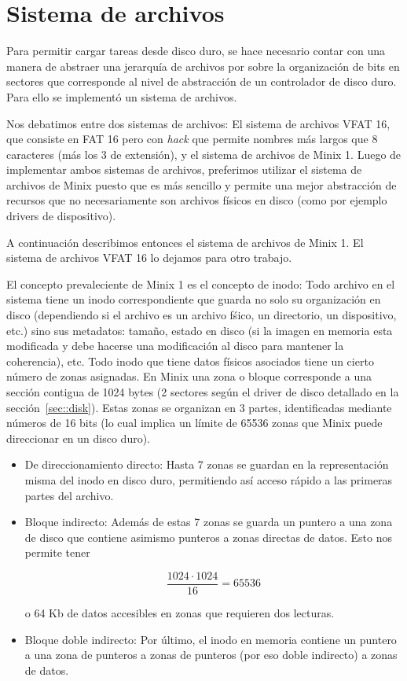 \section{Sistema de archivos}
\label{sec::filesystem}

Para permitir cargar tareas desde disco duro, se hace necesario contar con una manera de
abstraer una jerarqu\'ia de archivos por sobre la organizaci\'on de bits en sectores que
corresponde al nivel de abstracci\'on de un controlador de disco duro. Para ello se
implement\'o un sistema de archivos.

Nos debatimos entre dos sistemas de archivos: El sistema de archivos VFAT 16, que consiste
en FAT 16 pero con \textit{hack} que permite nombres m\'as largos que 8 caracteres (m\'as los
3 de extensi\'on), y el sistema de archivos de Minix 1. Luego de implementar ambos sistemas de
archivos, preferimos utilizar el sistema de archivos de Minix puesto que es m\'as sencillo y
permite una mejor abstracci\'on de recursos que no necesariamente son archivos f\'isicos en disco
(como por ejemplo drivers de dispositivo).

A continuaci\'on describimos entonces el sistema de archivos de Minix 1. El sistema de archivos
VFAT 16 lo dejamos para otro trabajo.

El concepto prevaleciente de Minix 1 es el concepto de inodo: Todo archivo en el sistema tiene un
inodo correspondiente que guarda no solo su organizaci\'on en disco (dependiendo si el archivo es
un archivo f\'sico, un directorio, un dispositivo, etc.) sino sus metadatos: tama\~no, estado en
disco (si la imagen en memoria esta modificada y debe hacerse una modificaci\'on al disco para mantener
la coherencia), etc. Todo inodo que tiene datos f\'isicos asociados tiene un cierto n\'umero de zonas 
asignadas. En Minix una zona o bloque corresponde a una secci\'on contigua de 1024 bytes (2 sectores
seg\'un el driver de disco detallado en la secci\'on~\ref{sec::disk}). Estas zonas se organizan en
3 partes, identificadas mediante n\'umeros de 16 bits (lo cual implica un l\'imite de 65536 zonas que
Minix puede direccionar en un disco duro).

\begin{itemize}
	\item De direccionamiento directo: Hasta 7 zonas se guardan en la representaci\'on misma del
	inodo en disco duro, permitiendo as\'i acceso r\'apido a las primeras partes del archivo.
	\item Bloque indirecto: Adem\'as de estas 7 zonas se guarda un puntero a una zona de disco
	que contiene asimismo punteros a zonas directas de datos. Esto nos permite tener
	
	\[
		\frac{1024 \cdot 1024}{16} = 65536
	\]

	o 64 Kb de datos accesibles en zonas que requieren dos lecturas.
	\item Bloque doble indirecto: Por \'ultimo, el inodo en memoria contiene un puntero a una zona
	de punteros a zonas de punteros (por eso doble indirecto) a zonas de datos.
\end{itemize}

